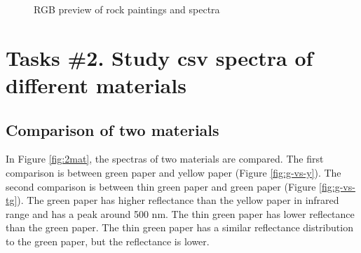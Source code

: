 \begin{figure}[H]
  \centering
  \hspace{0.1cm}
  \vspace{0.1cm}
  \caption[]{RGB preview of rock paintings and spectra }
  \label{fig:rock-painting}
\end{figure}

\section{Tasks \#2. Study csv spectra of different materials}

\subsection{Comparison of two materials}

In Figure \ref{fig:2mat}, the spectras of two materials are compared. The first comparison is between green paper and yellow paper (Figure \ref{fig:g-vs-y}). The second comparison is between thin green paper and green paper (Figure \ref{fig:g-vs-tg}). The green paper has higher reflectance than the yellow paper in infrared range and has a peak around 500 nm. The thin green paper has lower reflectance than the green paper. The thin green paper has a similar reflectance distribution to the green paper, but the reflectance is lower.


